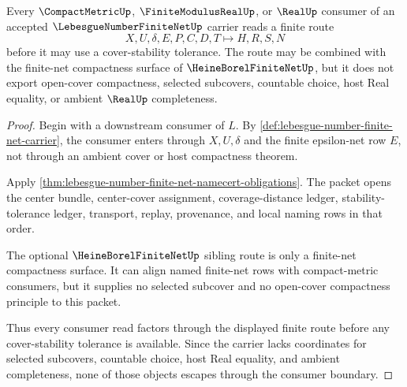 \begin{theorem}
\label{thm:lebesgue-number-finite-net-nonescape}
Every $\CompactMetricUp$, $\FiniteModulusRealUp$, or $\RealUp$ consumer of an accepted $\LebesgueNumberFiniteNetUp$ carrier reads a finite route
$$
X,U,\delta,E,P,C,D,T \longmapsto H,R,S,N
$$
before it may use a cover-stability tolerance. The route may be combined with the finite-net compactness surface of $\HeineBorelFiniteNetUp$, but it does not export open-cover compactness, selected subcovers, countable choice, host Real equality, or ambient $\RealUp$ completeness.
\end{theorem}
\begin{proof}
Begin with a downstream consumer of $L$. By \autoref{def:lebesgue-number-finite-net-carrier}, the consumer enters through $X,U,\delta$ and the finite epsilon-net row $E$, not through an ambient cover or host compactness theorem.

Apply \autoref{thm:lebesgue-number-finite-net-namecert-obligations}. The packet opens the center bundle, center-cover assignment, coverage-distance ledger, stability-tolerance ledger, transport, replay, provenance, and local naming rows in that order.

The optional $\HeineBorelFiniteNetUp$ sibling route is only a finite-net compactness surface. It can align named finite-net rows with compact-metric consumers, but it supplies no selected subcover and no open-cover compactness principle to this packet.

Thus every consumer read factors through the displayed finite route before any cover-stability tolerance is available. Since the carrier lacks coordinates for selected subcovers, countable choice, host Real equality, and ambient completeness, none of those objects escapes through the consumer boundary.
\end{proof}


